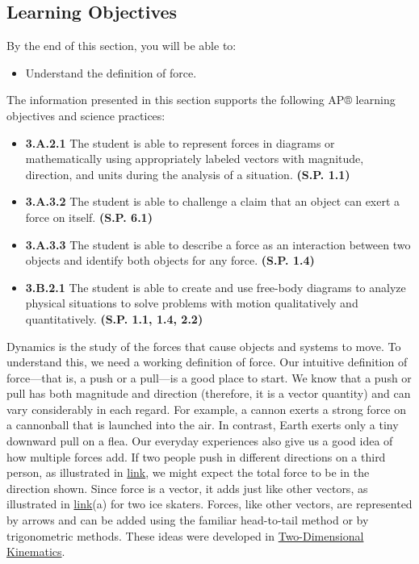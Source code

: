 \documentclass[
]{book}
\providecommand{\tightlist}{%
  \setlength{\itemsep}{0pt}\setlength{\parskip}{0pt}}
\newenvironment{learning-objectives}{}{}
\begin{document}
\hypertarget{fs-id2243190}{}
\begin{learning-objectives}

\hypertarget{learning-objectives-13}{%
\subsection{Learning Objectives}\label{learning-objectives-13}}

By the end of this section, you will be able to:

\begin{itemize}
\tightlist
\item
  Understand the definition of force.
\end{itemize}

The information presented in this section supports the following AP®
learning objectives and science practices:

\begin{itemize}
\tightlist
\item
  \textbf{3.A.2.1} The student is able to represent forces in diagrams or
  mathematically using appropriately labeled vectors with magnitude,
  direction, and units during the analysis of a situation. \textbf{(S.P.
  1.1)}
\item
  \textbf{3.A.3.2} The student is able to challenge a claim that an object
  can exert a force on itself. \textbf{(S.P. 6.1)}
\item
  \textbf{3.A.3.3} The student is able to describe a force as an
  interaction between two objects and identify both objects for any
  force. \textbf{(S.P. 1.4)}
\item
  \textbf{3.B.2.1} The student is able to create and use free-body diagrams
  to analyze physical situations to solve problems with motion
  qualitatively and quantitatively. \textbf{(S.P. 1.1, 1.4, 2.2)}
\end{itemize}

\end{learning-objectives}

\protect\hypertarget{import-auto-id2134480}{}{Dynamics} is the study of the
forces that cause objects and systems to move. To understand this, we
need a working definition of force. Our intuitive definition of
\protect\hypertarget{import-auto-id2712510}{}{force}---that is, a push or a
pull---is a good place to start. We know that a push or pull has both
magnitude and direction (therefore, it is a vector quantity) and can
vary considerably in each regard. For example, a cannon exerts a strong
force on a cannonball that is launched into the air. In contrast, Earth
exerts only a tiny downward pull on a flea. Our everyday experiences
also give us a good idea of how multiple forces add. If two people push
in different directions on a third person, as illustrated in
\protect\hyperlink{import-auto-id2379809}{link}, we might expect
the total force to be in the direction shown. Since force is a vector,
it adds just like other vectors, as illustrated in
\protect\hyperlink{import-auto-id2379809}{link}(a) for two ice
skaters. Forces, like other vectors, are represented by arrows and can
be added using the familiar head-to-tail method or by trigonometric
methods. These ideas were developed in \href{/m54779}{Two-Dimensional
Kinematics}.
\end{document}
